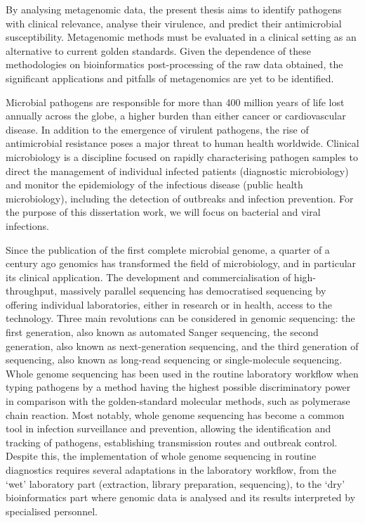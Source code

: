 By analysing metagenomic data, the present thesis aims to identify pathogens with clinical relevance, analyse their virulence, and predict their antimicrobial susceptibility. Metagenomic methods must be evaluated in a clinical setting as an alternative to current golden standards. Given the dependence of these methodologies on bioinformatics post-processing of the raw data obtained, the significant applications and pitfalls of metagenomics are yet to be identified.

Microbial pathogens are responsible for more than 400 million years of life lost annually across the globe, a higher burden than either cancer or cardiovascular disease. In addition to the emergence of virulent pathogens, the rise of antimicrobial resistance poses a major threat to human health worldwide. Clinical microbiology is a discipline focused on rapidly characterising pathogen samples to direct the management of individual infected patients (diagnostic microbiology) and monitor the epidemiology of the infectious disease (public health microbiology), including the detection of outbreaks and infection prevention. For the purpose of this dissertation work, we will focus on bacterial and viral infections.

Since the publication of the first complete microbial genome, a quarter of a century ago genomics has transformed the field of microbiology, and in particular its clinical application. The development and commercialisation of high-throughput, massively parallel sequencing has democratised sequencing by offering individual laboratories, either in research or in health, access to the technology. Three main revolutions can be considered in
genomic sequencing: the first generation, also known as automated Sanger sequencing, the second generation, also known as next-generation sequencing, and the third generation of sequencing, also known as long-read sequencing or single-molecule sequencing. Whole genome sequencing has been used in the routine laboratory workflow when typing pathogens by a method having the highest possible discriminatory power in comparison with the golden-standard molecular methods, such as polymerase chain reaction. Most notably, whole genome sequencing has become a common tool in infection surveillance and prevention, allowing the identification and tracking of pathogens, establishing transmission routes and outbreak control. Despite this, the implementation of whole genome sequencing in routine diagnostics requires several adaptations in the laboratory workflow, from the ‘wet’ laboratory part (extraction, library preparation, sequencing), to the ‘dry’ bioinformatics part where genomic data is analysed and its results interpreted by specialised personnel. 

